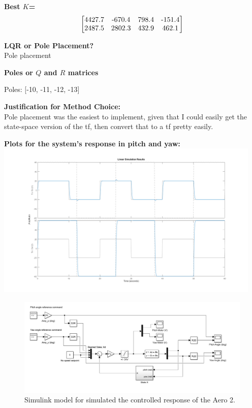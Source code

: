 \documentclass[11pt]{article}
\begin{document}
\textbf{Best \( K \)= }\\

\[
\begin{bmatrix}
    $4427.7$ & $-670.4$ & $798.4$ & $-151.4$\\
    $2487.5$ & $2802.3$ & $432.9$ & $462.1$\\
\end{bmatrix}
\]

\textbf{LQR or Pole Placement?}\\

Pole placement

\vspace{1cm} %

\textbf{Poles or \( Q \) and \( R \) matrices\\}

Poles: [-10, -11, -12, -13]

\vspace{0.5cm} %

\textbf{Justification for Method Choice:}\\

Pole placement was the easiest to implement, given that I could easily get the state-space version of the tf, then convert that to a tf pretty easily. 
\vspace{2cm} %

\textbf{Plots for the system's response in pitch and yaw:}\\

    \centering
  \includegraphics[width=5in]{prelab2.png}


\begin{figure}[ht!]
  \centering
  \includegraphics[width=5in]{simulink_s.jpg}
  \caption{Simulink model for simulated the controlled response of the Aero 2.}
  \label{fig:simulinks}
\end{figure}
\end{document}
